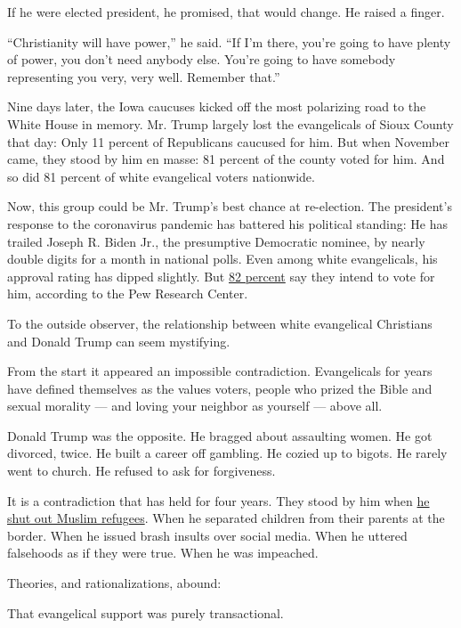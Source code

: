 If he were elected president, he promised, that would change. He raised
a finger.

``Christianity will have power,'' he said. ``If I'm there, you're going
to have plenty of power, you don't need anybody else. You're going to
have somebody representing you very, very well. Remember that.''

Nine days later, the Iowa caucuses kicked off the most polarizing road
to the White House in memory. Mr. Trump largely lost the evangelicals of
Sioux County that day: Only 11 percent of Republicans caucused for him.
But when November came, they stood by him en masse: 81 percent of the
county voted for him. And so did 81 percent of white evangelical voters
nationwide.

Now, this group could be Mr. Trump's best chance at re-election. The
president's response to the coronavirus pandemic has battered his
political standing: He has trailed Joseph R. Biden Jr., the presumptive
Democratic nominee, by nearly double digits for a month in national
polls. Even among white evangelicals, his approval rating has dipped
slightly. But
\href{https://www.pewresearch.org/fact-tank/2020/07/01/white-evangelical-approval-of-trump-slips-but-eight-in-ten-say-they-would-vote-for-him/}{82
percent} say they intend to vote for him, according to the Pew Research
Center.

To the outside observer, the relationship between white evangelical
Christians and Donald Trump can seem mystifying.

From the start it appeared an impossible contradiction. Evangelicals for
years have defined themselves as the values voters, people who prized
the Bible and sexual morality --- and loving your neighbor as yourself
--- above all.

Donald Trump was the opposite. He bragged about assaulting women. He got
divorced, twice. He built a career off gambling. He cozied up to bigots.
He rarely went to church. He refused to ask for forgiveness.

It is a contradiction that has held for four years. They stood by him
when
\href{https://www.nytimes3xbfgragh.onion/2017/01/27/us/politics/trump-syrian-refugees.html}{he
shut out Muslim refugees}. When he separated children from their parents
at the border. When he issued brash insults over social media. When he
uttered falsehoods as if they were true. When he was impeached.

Theories, and rationalizations, abound:

That evangelical support was purely transactional.

